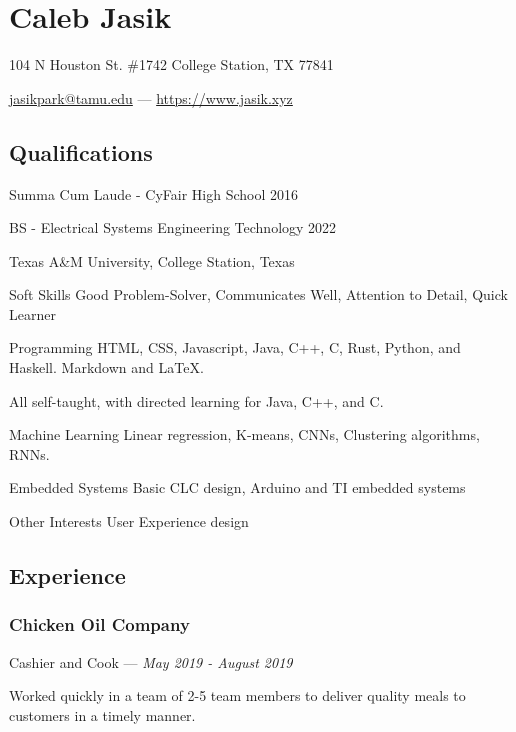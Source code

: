 \documentclass[letterpaper,10pt]{article}
\begin{document}
    \section{\Huge Caleb Jasik}\label{sec:hugecaleb-jasik}

    \hfill 104 N Houston St. \#1742 College Station, TX 77841

    \hfill \href{mailto:jasikpark@tamu.edu}{jasikpark@tamu.edu} ---
    \href{https://jasik.xyz}{https://www.jasik.xyz}

    \subsection{Qualifications}\label{subsec:qualifications}

    Summa Cum Laude - CyFair High School 2016

    BS - Electrical Systems Engineering Technology 2022

    Texas A\&M University, College Station, Texas

    \begin{skills}
        \item[Soft Skills]
        Good Problem-Solver, Communicates Well, Attention to Detail, Quick Learner
        \item[Programming]
        HTML, CSS, Javascript, Java, C++, C, Rust, Python, and Haskell. Markdown and LaTeX.

        All self-taught, with directed learning for Java, C++, and C\@.
        \item[Machine Learning]
        Linear regression, K-means, CNNs, Clustering algorithms, RNNs.
        \item[Embedded Systems]
        Basic CLC design, Arduino and TI embedded systems
        \item[Other Interests]
        User Experience design
    \end{skills}


    \subsection{Experience}\label{subsec:experience}

    \subsubsection{Chicken Oil Company}
    \hfill Cashier and Cook --- \emph{May 2019 - August 2019}

    Worked quickly in a team of 2-5 team members to deliver quality meals to customers in a timely manner.
\end{document}
